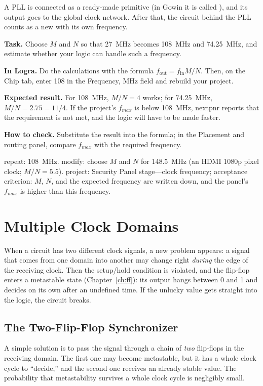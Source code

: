 A PLL is connected as a ready-made primitive (in Gowin it is called
), and its output goes to the global clock network. After that, the
circuit behind the PLL counts as a new  with its own
frequency.

\begin{diybox}
\textbf{Task.} Choose $M$ and $N$ so that 27~MHz becomes 108~MHz and 74.25~MHz, and estimate whether your logic can handle such a frequency.

\textbf{In Logra.} Do the calculations with the formula $f_{\text{out}}=f_{\text{in}}M/N$. Then, on the Chip tab, enter 108 in the Frequency, MHz field and rebuild your project.

\textbf{Expected result.} For 108~MHz, $M/N=4$ works; for 74.25~MHz, $M/N=2.75=11/4$. If the project's $f_{max}$ is below 108~MHz, nextpnr reports that the requirement is not met, and the logic will have to be made faster.

\textbf{How to check.} Substitute the result into the formula; in the Placement and routing panel, compare $f_{max}$ with the required frequency.

 repeat: 108~MHz.  modify: choose $M$ and $N$ for 148.5~MHz (an HDMI 1080p pixel clock; $M/N=5.5$).  project: Security Panel stage---clock frequency; acceptance criterion: $M$, $N$, and the expected frequency are written down, and the panel's $f_{max}$ is higher than this frequency.
\end{diybox}

\section{Multiple Clock Domains}

When a circuit has two different clock signals, a new problem appears: a signal
that comes from one domain into another may change right \emph{during} the
edge of the receiving clock. Then the setup/hold condition is violated, and
the flip-flop enters a metastable state (Chapter~\ref{ch:ff}): its output hangs
between 0 and 1 and decides on its own after an undefined time. If the
unlucky value gets straight into the logic, the circuit breaks.

\subsection{The Two-Flip-Flop Synchronizer}

A simple solution is to pass the signal through a chain of \emph{two}
flip-flops in the receiving domain. The first one may become metastable, but
it has a whole clock cycle to ``decide,'' and the second one receives an
already stable value. The probability that metastability survives a whole
clock cycle is negligibly small.

